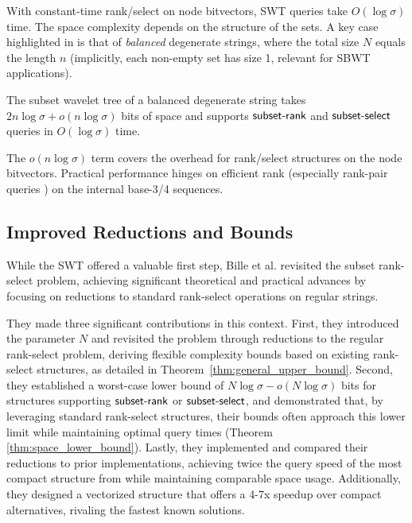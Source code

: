 With constant-time rank/select on node bitvectors, SWT queries take $O(\log \sigma)$ time. The space complexity depends on the structure of the sets. A key case highlighted in \cite{SubsetWT} is that of \emph{balanced} degenerate strings, where the total size $N$ equals the length $n$ (implicitly, each non-empty set has size 1, relevant for SBWT applications).

\begin{theorem} \label{thm:swt_space_balanced}
    The subset wavelet tree of a balanced degenerate string takes $2n \log \sigma + o(n \log \sigma)$ bits of space and supports $\textsf{subset-rank}$ and $\textsf{subset-select}$ queries in $O(\log \sigma)$ time.
\end{theorem}
The $o(n \log \sigma)$ term covers the overhead for rank/select structures on the node bitvectors. Practical performance hinges on efficient rank (especially rank-pair queries \cite{SubsetWT}) on the internal base-3/4 sequences.


\subsection{Improved Reductions and Bounds}
\label{sec:degenerate_string_better}

While the SWT offered a valuable first step, Bille et al. \cite{bille2023rank} revisited the subset rank-select problem, achieving significant theoretical and practical advances by focusing on reductions to standard rank-select operations on regular strings.

\noindent They made three significant contributions in this context. First, they introduced the parameter $N$ and revisited the problem through reductions to the regular rank-select problem, deriving flexible complexity bounds based on existing rank-select structures, as detailed in Theorem~\ref{thm:general_upper_bound}. Second, they established a worst-case lower bound of $N\log \sigma - o(N\log \sigma)$ bits for structures supporting $\textsf{subset-rank}$ or $\textsf{subset-select}$, and demonstrated that, by leveraging standard rank-select structures, their bounds often approach this lower limit while maintaining optimal query times (Theorem \ref{thm:space_lower_bound}). Lastly, they implemented and compared their reductions to prior implementations, achieving twice the query speed of the most compact structure from \cite{SubsetWT} while maintaining comparable space usage. Additionally, they designed a vectorized structure that offers a 4-7x speedup over compact alternatives, rivaling the fastest known solutions.


